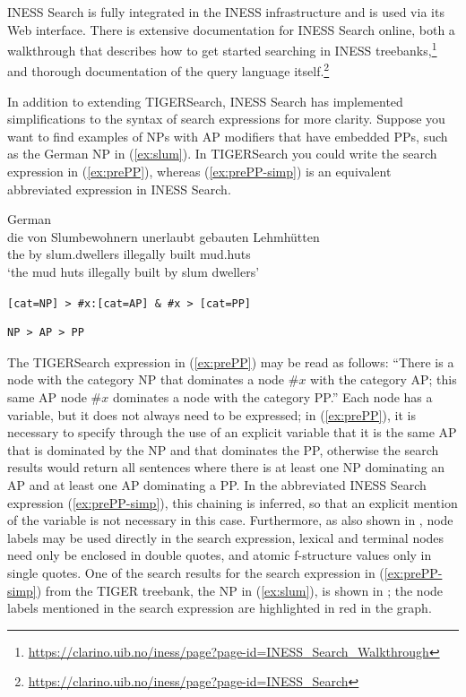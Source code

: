 \documentclass[output=paper,hidelinks]{langscibook}
\begin{document}
INESS Search is fully integrated in the INESS infrastructure and is used via its Web interface.
There is extensive documentation for INESS Search online, both a walkthrough that describes how to get started searching in INESS treebanks,\footnote{\url{https://clarino.uib.no/iness/page?page-id=INESS_Search_Walkthrough}} and thorough documentation of the query language itself.\footnote{\url{https://clarino.uib.no/iness/page?page-id=INESS_Search}}

In addition to extending TIGERSearch, INESS Search has implemented simplifications to the syntax of search expressions for more clarity.
Suppose you want to find examples of NPs with AP modifiers that have embedded PPs, such as the German NP in (\ref{ex:slum}). In TIGERSearch you could write the search expression in (\ref{ex:prePP}), whereas (\ref{ex:prePP-simp}) is an equivalent abbreviated expression in INESS Search.

\ea German\\
\gll die von Slumbewohnern unerlaubt gebauten Lehmhütten\\  
     the by {slum.dwellers} illegally built {mud.huts}\\ 
\glt `the mud huts illegally built by slum dwellers'
\label{ex:slum}
\z

\ea
\label{ex:prePP}
\texttt{[cat=\textquotedbl NP\textquotedbl] > \#x:[cat=\textquotedbl AP\textquotedbl] \& \#x > [cat=\textquotedbl PP\textquotedbl]}\\
\z

\ea
\label{ex:prePP-simp}
\begin{verbatim}
NP > AP > PP
\end{verbatim}
\z

\noindent The TIGERSearch expression in (\ref{ex:prePP}) may be read as follows: ``There is a node with the category NP that dominates a node $\#x$ with the category AP; this same AP node $\#x$ dominates a node with the category PP.''
Each node has a variable, but it does not always need to be expressed; in (\ref{ex:prePP}), it is necessary to specify through the use of an explicit variable that it is the same AP that is dominated by the NP and that dominates the PP, otherwise the search results would return all sentences where there is at least one NP dominating an AP and at least one AP dominating a PP.
In the abbreviated INESS Search expression (\ref{ex:prePP-simp}), this chaining is inferred, so that an explicit mention of the variable is not necessary in this case.
Furthermore, as also shown in , node labels may be used directly in the search expression, lexical and terminal nodes need only be enclosed in double quotes, and atomic f-structure values only in single quotes.
One of the search results for the search expression in (\ref{ex:prePP-simp}) from the TIGER treebank, the NP in (\ref{ex:slum}), is shown in ; the node labels mentioned in the search expression are highlighted in red in the graph.
\end{document}
